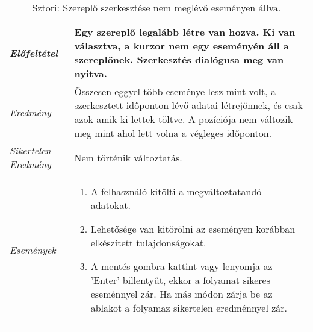 \begin{table}[H]
	\centering
	\begin{tabular}{ | m{} | m{} | }
		\hline
		\emph{Előfeltétel} & Egy szereplő legalább létre van hozva. Ki van választva, a kurzor nem egy eseményén áll a szereplőnek. Szerkesztés dialógusa meg van nyitva. \\
		\hline
		\emph{Eredmény} & Összesen eggyel több eseménye lesz mint volt, a szerkesztett időponton lévő adatai létrejönnek, és csak azok amik ki lettek töltve. A pozíciója nem változik meg mint ahol lett volna a végleges időponton. \\
		\hline
		\emph{Sikertelen Eredmény} & Nem történik változtatás.  \\
		\hline
		\hline
		\emph{Események} &

		\begin{enumerate}[itemsep=-1ex]
			\item A felhasználó kitölti a megváltoztatandó adatokat.
			\item Lehetősége van kitörölni az eseményen korábban elkészített tulajdonságokat.
			\item A mentés gombra kattint vagy lenyomja az 'Enter' billentyűt, ekkor a folyamat sikeres eseménnyel zár. Ha más módon zárja be az ablakot a folyamaz sikertelen eredménnyel zár.
		\end{enumerate}
		\\
		\hline
	\end{tabular}
	\caption{Sztori: Szereplő szerkesztése nem meglévő eseményen állva.}
	\label{tab:story-actor-edit-not-on-event}
\end{table}



